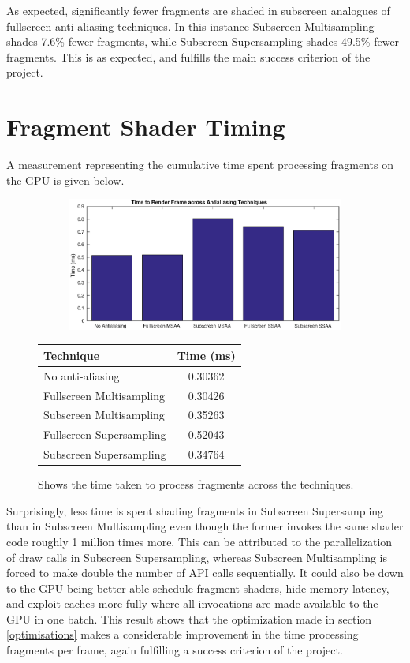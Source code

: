 \documentclass[12pt,a4paper,twoside,openright]{report}
\begin{document}
As expected, significantly fewer fragments are shaded in subscreen analogues of fullscreen anti-aliasing techniques. In this instance Subscreen Multisampling shades 7.6\% fewer fragments, while Subscreen Supersampling shades 49.5\% fewer fragments. This is as expected, and fulfills the main success criterion of the project.

\clearpage

\section{Fragment Shader Timing}

A measurement representing the cumulative time spent processing fragments on the GPU is given below.

\begin{figure}[tbh]

 
\begin{subfigure}{0.5\textwidth}
\includegraphics[width=1.2\linewidth]{figs/timeToRenderFrame.eps}
\end{subfigure}
\qquad
\begin{tabular}{l|c}
Technique   & Time (ms) \\ 
\hline
No anti-aliasing      & 0.30362 \\
Fullscreen Multisampling     & 0.30426 \\
Subscreen Multisampling    &  0.35263  \\
Fullscreen Supersampling      &  0.52043   \\
Subscreen Supersampling    &  0.34764  \\
\end{tabular}
 
\caption{Shows the time taken to process fragments across the techniques.}
\end{figure}

Surprisingly, less time is spent shading fragments in Subscreen Supersampling than in Subscreen Multisampling even though the former invokes the same shader code roughly 1 million times more. This can be attributed to the parallelization of draw calls in Subscreen Supersampling, whereas Subscreen Multisampling is forced to make double the number of API calls sequentially. It could also be down to the GPU being better able schedule fragment shaders, hide memory latency, and exploit caches more fully where all invocations are made available to the GPU in one batch. This result shows that the optimization made in section \ref{optimisations} makes a considerable improvement in the time processing fragments per frame, again fulfilling a success criterion of the project. \\
\end{document}
